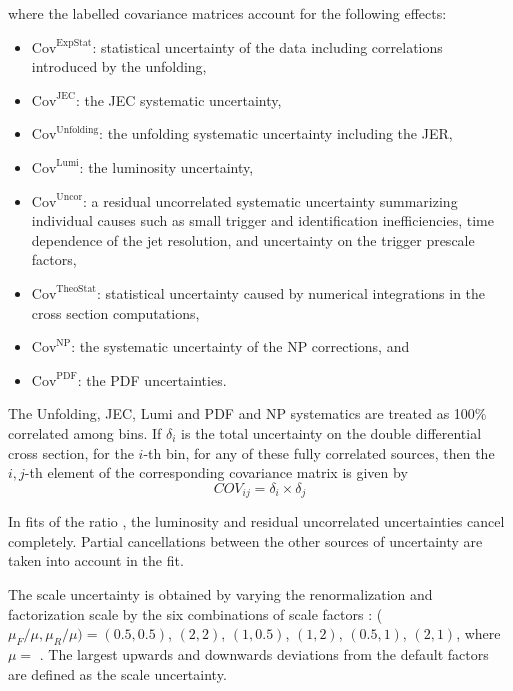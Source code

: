 where the labelled covariance matrices account for the following
effects:

\begin{itemize}
\item{$\mathrm{Cov}^\mathrm{ExpStat}$: statistical uncertainty of the
    data including correlations introduced by the unfolding,}
\item{$\mathrm{Cov}^\mathrm{JEC}$: the JEC
systematic uncertainty,}
\item{$\mathrm{Cov}^\mathrm{Unfolding}$: the unfolding systematic
    uncertainty including the JER,}
\item{$\mathrm{Cov}^\mathrm{Lumi}$: the luminosity uncertainty,}
\item{$\mathrm{Cov}^\mathrm{Uncor}$: a residual uncorrelated
    systematic uncertainty summarizing individual causes such as small
    trigger and identification inefficiencies, time dependence of the
    jet \pt resolution, and uncertainty on the trigger prescale
    factors,}
\item{$\mathrm{Cov}^\mathrm{TheoStat}$: statistical uncertainty caused
    by numerical integrations in the cross section computations,}
\item{$\mathrm{Cov}^\mathrm{NP}$: the systematic uncertainty of the
    NP corrections, and}
\item{$\mathrm{Cov}^\mathrm{PDF}$: the PDF uncertainties.}
\end{itemize}

The Unfolding, JEC, Lumi and PDF and NP systematics are treated as 100$\%$ correlated among \httwo bins. If $\delta_i$ is the
total uncertainty on the double differential cross section, for the $i$-th \httwo bin, for any of these fully correlated sources, then the
$i,j$-th element of the corresponding covariance matrix is given by
\begin{equation*}
 COV_{ij} = \delta_i \times \delta_j
\end{equation*}

In fits of the ratio \ratio, the luminosity and residual uncorrelated
uncertainties cancel completely. Partial cancellations between the
other sources of uncertainty are taken into account in the fit.

The scale uncertainty is obtained by
varying the renormalization and factorization
scale by the six combinations of scale factors : ($\mu_F/\mu,\mu_R/\mu) = (0.5,0.5)$, $(2,2)$, $(1,0.5)$, $(1,2)$,
$(0.5,1)$, $(2,1)$, where $\mu=$ \httwo. The largest upwards and downwards deviations from the default factors are defined as the
scale uncertainty.

